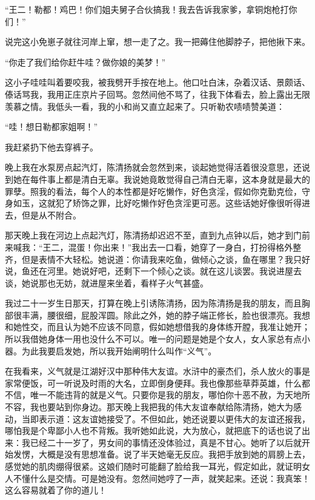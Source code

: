  “王二！勒都！鸡巴！你们姐夫舅子合伙搞我！我去告诉我家爹，拿铜炮枪打你们！” 
 
 说完这小免崽子就往河岸上窜，想一走了之。我一把薅住他脚脖子，把他揪下来。 
 
 “你走了我们给你赶牛哇？做你娘的美梦！” 
 
 这小子哇哇叫着要咬我，被我劈开手按在地上。他口吐白沫，杂着汉话、景颇话、傣话骂我，我用正庄京片子回骂。忽然间他不骂了，往我下体看去，脸上露出无限羡慕之情。我低头一看，我的小和尚又直立起来了。只听勒农啧啧赞美道： 
 
 “哇！想日勒都家姐啊！” 
 
 我赶紧扔下他去穿裤子。 
 
 晚上我在水泵房点起汽灯，陈清扬就会忽然到来，谈起她觉得活着很没意思，还说到她在每件事上都是清白无辜。我说她竟敢觉得自己清白无辜，这本身就是最大的罪孽。照我的看法，每个人的本性都是好吃懒作，好色贪淫，假如你克勤克俭，守身如玉，这就犯了矫饰之罪，比好吃懒作好色贪淫更可恶。这些话她好像很听得进去，但是从不附合。 
 
 那天晚上我在河边上点起汽灯，陈清扬却迟迟不至，直到九点钟以后，她才到门前来喊我：“王二，混蛋！你出来！”我出去一口看，她穿了一身白，打扮得格外整齐，但是表情不大轻松。她说道：你请我来吃鱼，做倾心之谈，鱼在哪里？我只好说，鱼还在河里。她说好吧，还剩下一个倾心之谈。就在这儿谈罢。我说进屋去谈，她说那也无妨，就进屋来坐着，看样子火气甚盛。 
 
 我过二十一岁生日那天，打算在晚上引诱陈清扬，因为陈清扬是我的朋友，而且胸部很丰满，腰很细，屁股浑圆。除此之外，她的脖子端正修长，脸也很漂亮。我想和她性交，而且认为她不应该不同意，假如她想借我的身体练开膛，我准让她开；所以我借她身体一用也没什么不可以。唯一的问题是她是个女人，女人家总有点小器。为此我要启发她，所以我开始阐明什么叫作“义气”。 
 
 在我看来，义气就是江湖好汉中那种伟大友谊。水浒中的豪杰们，杀人放火的事是家常便饭，可一听说及时雨的大名，立即倒身便拜。我也像那些草莽英雄，什么都不信，唯一不能违背的就是义气。只要你是我的朋友，哪怕你十恶不赦，为天地所不容，我也要站到你身边。那天晚上我把我的伟大友谊奉献给陈清扬，她大为感动，当即表示道：这友谊她接受了。不但如此，她还说要以更伟大的友谊还报我，哪怕我是个卑鄙小人也不背叛。我听她如此说，大为放心，就把底下的话也说了出来：我已经二十一岁了，男女间的事情还没体验过，真是不甘心。她听了以后就开始发愣，大概是没有思想准备。说了半天她毫无反应。我把手放到她的肩膀上去，感觉她的肌肉绷得很紧。这娘们随时可能翻了脸给我一耳光，假定如此，就证明女人不懂什么是交情。可是她没有。忽然间她哼了一声，就笑起来。还说：我真笨！这么容易就着了你的道儿！ 
 

